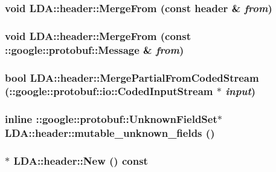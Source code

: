 \label{class_l_d_a_1_1header_aa5306ee3c56f17f9acc062d15a80ddbb}
\hypertarget{class_l_d_a_1_1header_a2bf1c4d7b0ce37755af012923d121702}{
\subsubsection[{MergeFrom}]{\setlength{\rightskip}{0pt plus 5cm}void LDA::header::MergeFrom (const {\bf header} \& {\em from})}}
\label{class_l_d_a_1_1header_a2bf1c4d7b0ce37755af012923d121702}
\hypertarget{class_l_d_a_1_1header_a16b2cf35b0f0d49031c993423f01c80e}{
\subsubsection[{MergeFrom}]{\setlength{\rightskip}{0pt plus 5cm}void LDA::header::MergeFrom (const ::google::protobuf::Message \& {\em from})}}
\label{class_l_d_a_1_1header_a16b2cf35b0f0d49031c993423f01c80e}
\hypertarget{class_l_d_a_1_1header_aa1c4bd4d4ebf101f3dab2c0c3e68c1e6}{
\subsubsection[{MergePartialFromCodedStream}]{\setlength{\rightskip}{0pt plus 5cm}bool LDA::header::MergePartialFromCodedStream (::google::protobuf::io::CodedInputStream $\ast$ {\em input})}}
\label{class_l_d_a_1_1header_aa1c4bd4d4ebf101f3dab2c0c3e68c1e6}
\hypertarget{class_l_d_a_1_1header_a760a263c4ea3c6ead8dc5559c3c5595d}{
\subsubsection[{mutable\_\-unknown\_\-fields}]{\setlength{\rightskip}{0pt plus 5cm}inline ::google::protobuf::UnknownFieldSet$\ast$ LDA::header::mutable\_\-unknown\_\-fields ()}}
\label{class_l_d_a_1_1header_a760a263c4ea3c6ead8dc5559c3c5595d}
\hypertarget{class_l_d_a_1_1header_ac86a02dd1ae80fac5d3e70486d5cc887}{
\subsubsection[{New}]{ $\ast$ LDA::header::New () const}}

